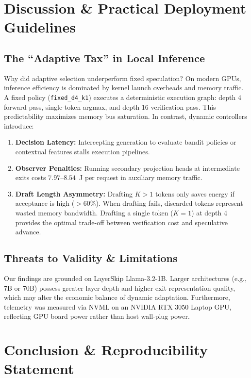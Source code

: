 \documentclass[10pt,twocolumn,letterpaper]{article}
\begin{document}
\section{Discussion \& Practical Deployment Guidelines}

\subsection{The ``Adaptive Tax'' in Local Inference}
Why did adaptive selection underperform fixed speculation? On modern GPUs, inference efficiency is dominated by kernel launch overheads and memory traffic. A fixed policy (\texttt{fixed\_d4\_k1}) executes a deterministic execution graph: depth 4 forward pass, single-token argmax, and depth 16 verification pass. This predictability maximizes memory bus saturation. In contrast, dynamic controllers introduce:
\begin{enumerate}
    \item \textbf{Decision Latency:} Intercepting generation to evaluate bandit policies or contextual features stalls execution pipelines.
    \item \textbf{Observer Penalties:} Running secondary projection heads at intermediate exits costs $7.97$--$8.54$~J per request in auxiliary memory traffic.
    \item \textbf{Draft Length Asymmetry:} Drafting $K > 1$ tokens only saves energy if acceptance is high ($>60\%$). When drafting fails, discarded tokens represent wasted memory bandwidth. Drafting a single token ($K=1$) at depth 4 provides the optimal trade-off between verification cost and speculative advance.
\end{enumerate}

\subsection{Threats to Validity \& Limitations}
Our findings are grounded on LayerSkip Llama-3.2-1B. Larger architectures (e.g., 7B or 70B) possess greater layer depth and higher exit representation quality, which may alter the economic balance of dynamic adaptation. Furthermore, telemetry was measured via NVML on an NVIDIA RTX 3050 Laptop GPU, reflecting GPU board power rather than host wall-plug power.

\section{Conclusion \& Reproducibility Statement}
\end{document}
